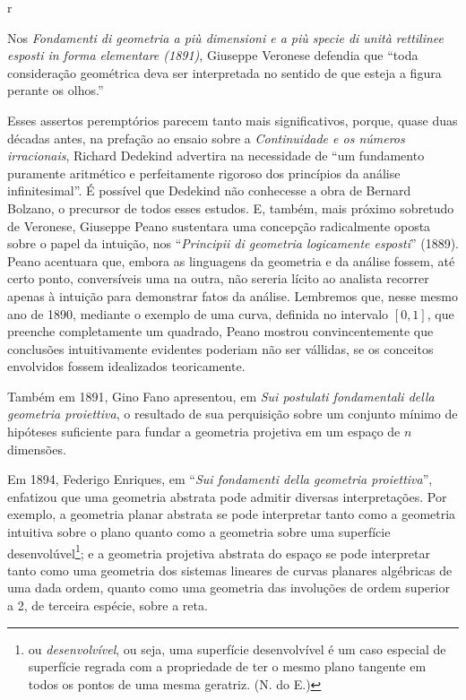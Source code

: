 r\documentclass{hipatia}
\begin{document}
Nos \emph{Fondamenti di geometria a più dimensioni e a più specie di unità rettilinee esposti in forma elementare (1891)}, Giuseppe Veronese defendia que ``toda consideração geométrica deva ser interpretada no sentido de que esteja a figura perante os olhos.'' \cite[\emph{apud}, p. 301]{bottazzini2001}  

Esses assertos peremptórios parecem tanto mais significativos, porque, quase duas décadas antes, na prefação ao ensaio sobre a \emph{Continuidade e os números irracionais},  Richard Dedekind advertira na necessidade de ``um fundamento puramente aritmético e perfeitamente rigoroso dos princípios da análise infinitesimal''. É possível que Dedekind não conhecesse a obra de Bernard Bolzano, o precursor de todos esses estudos.  \cite[ prefação, p. III]{dedekind1872}                                                                                                              
E, também, mais próximo sobretudo de Veronese, Giuseppe Peano sustentara uma concepção radicalmente oposta sobre o papel da intuição, nos  ``\emph{Principii di geometria logicamente esposti}'' (1889). Peano acentuara que, embora as linguagens da geometria e da análise fossem, até certo ponto, conversíveis uma na outra, não sereria lícito ao analista recorrer apenas à intuição para demonstrar fatos da análise. Lembremos que, nesse mesmo ano de 1890, mediante o exemplo de uma curva, definida no intervalo $[0, 1]$, que preenche completamente um quadrado, Peano mostrou convincentemente que conclusões intuitivamente evidentes poderiam não ser vállidas, se os conceitos envolvidos fossem idealizados teoricamente.  \cite[p. 143]{kneebone1963}

Também em 1891, Gino Fano apresentou, em \emph{Sui postulati fondamentali della geometria proiettiva}, o resultado de sua perquisição sobre um conjunto mínimo de hipóteses suficiente para fundar a geometria projetiva em um espaço de $n$ dimensões.  \cite[p. 30]{bottazzini2001} 

Em 1894, Federigo Enriques, em ``\emph{Sui fondamenti della geometria proiettiva}'', enfatizou que uma geometria abstrata pode admitir diversas interpretações. Por exemplo, a geometria planar abstrata se pode interpretar tanto como a geometria intuitiva sobre o plano quanto como a geometria sobre uma superfície desenvolúvel\footnote{ou \emph{desenvolvível}, ou seja, uma superfície desenvolvível é um caso especial de superfície regrada com
a propriedade de ter o mesmo plano tangente em todos os pontos de uma mesma geratriz. (N. do E.)}; e a geometria projetiva abstrata do espaço se pode interpretar tanto como uma geometria dos sistemas lineares de curvas planares algébricas de uma dada ordem, quanto como uma geometria das involuções de ordem superior a 2, de terceira espécie, sobre a reta.   \cite[ p. 312]{bottazzini2001} 
\end{document}
